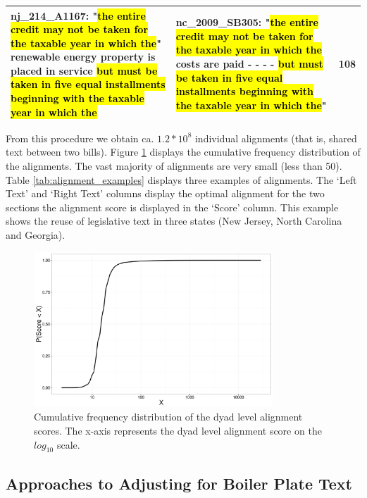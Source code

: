 \documentclass[12pt]{article} %
\begin{document}
\begin{table}[ht!]
\begin{tabular}{p{}|p{}|p{}}
\textbf{nj\_214\_A1167}: "\hl{the entire credit may not be taken for the taxable year in which the}" renewable energy property is placed in service \hl{but must be taken in five equal installments beginning with the taxable year in which the} & \textbf{nc\_2009\_SB305}: "\hl{the entire credit may not be taken for the taxable year in which the} costs are paid - - - - \hl{but must be taken in five equal installments beginning with the taxable year in which the}" & 108\\
\hline
\end{tabular}
\egroup
\end{table}

\clearpage

From this procedure we obtain ca. $1.2 * 10^8$ individual alignments (that is, shared
text between two bills). Figure \ref{fig:alignment_score_distribution} displays the cumulative frequency
distribution of the alignments. The vast majority of alignments are very small
(less than 50). Table \ref{tab:alignment_examples} displays three examples of alignments. The `Left Text' and `Right Text' columns display the optimal alignment for the two sections the alignment score is displayed in the `Score' column. This example shows the reuse of legislative text in three states (New Jersey, North Carolina and Georgia).


\begin{figure}[ht!]
    \centering
    \includegraphics[width=0.8\textwidth]{figures/alignment_score_distribution.png}
    \caption{Cumulative frequency distribution of the dyad level alignment
    scores. The x-axis represents the dyad level alignment score on the
    $log_{10}$ scale.}
    \label{fig:alignment_score_distribution}
\end{figure}



\subsection{Approaches to Adjusting for Boiler Plate Text}
\end{document}
